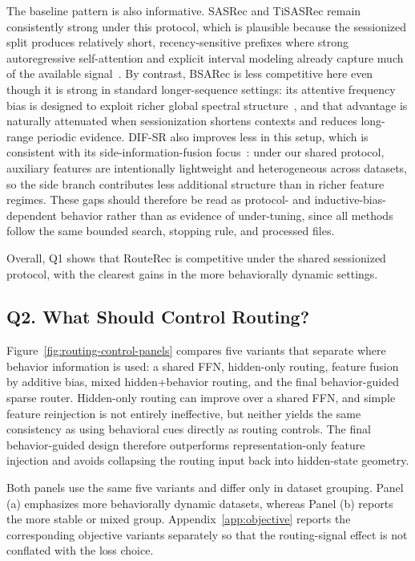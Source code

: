 \documentclass[sigconf,review,anonymous]{acmart}
\begin{document}
The baseline pattern is also informative. SASRec and TiSASRec remain consistently strong under this protocol, which is plausible because the sessionized split produces relatively short, recency-sensitive prefixes where strong autoregressive self-attention and explicit interval modeling already capture much of the available signal~\cite{kang2018sasrec,li2020tisasrec}. By contrast, BSARec is less competitive here even though it is strong in standard longer-sequence settings: its attentive frequency bias is designed to exploit richer global spectral structure~\cite{shin2024bsarec}, and that advantage is naturally attenuated when sessionization shortens contexts and reduces long-range periodic evidence. DIF-SR also improves less in this setup, which is consistent with its side-information-fusion focus~\cite{xie2022difsr}: under our shared protocol, auxiliary features are intentionally lightweight and heterogeneous across datasets, so the side branch contributes less additional structure than in richer feature regimes. These gaps should therefore be read as protocol- and inductive-bias-dependent behavior rather than as evidence of under-tuning, since all methods follow the same bounded search, stopping rule, and processed files.

Overall, Q1 shows that RouteRec is competitive under the shared sessionized protocol, with the clearest gains in the more behaviorally dynamic settings.

\subsection{Q2. What Should Control Routing?}
\label{sec:routing-control}
Figure~\ref{fig:routing-control-panels} compares five variants that separate where behavior information is used: a shared FFN, hidden-only routing, feature fusion by additive bias, mixed hidden+behavior routing, and the final behavior-guided sparse router. Hidden-only routing can improve over a shared FFN, and simple feature reinjection is not entirely ineffective, but neither yields the same consistency as using behavioral cues directly as routing controls. The final behavior-guided design therefore outperforms representation-only feature injection and avoids collapsing the routing input back into hidden-state geometry.

Both panels use the same five variants and differ only in dataset grouping. Panel (a) emphasizes more behaviorally dynamic datasets, whereas Panel (b) reports the more stable or mixed group. Appendix~\ref{app:objective} reports the corresponding objective variants separately so that the routing-signal effect is not conflated with the loss choice.
\end{document}
